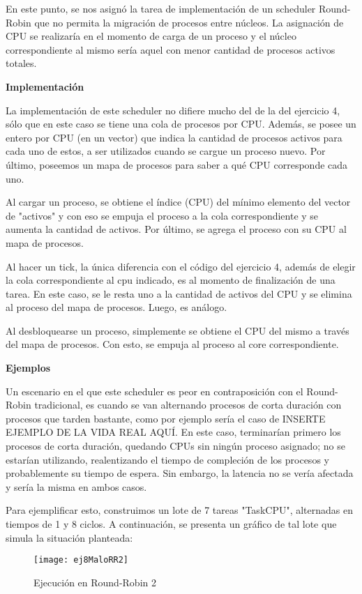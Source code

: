 En este punto, se nos asignó la tarea de implementación de un scheduler Round-Robin que no permita la migración de procesos
entre núcleos. La asignación de CPU se realizaría en el momento de carga de un proceso y el núcleo correspondiente al mismo sería aquel con menor cantidad de procesos activos totales.

\textbf{Implementación}

La implementación de este scheduler no difiere mucho del de la del ejercicio 4, sólo que en este caso se tiene una cola de procesos por CPU. Además, se posee un entero por CPU (en un vector) que indica la cantidad de procesos activos para cada uno de estos, a ser utilizados cuando se cargue un proceso nuevo. Por último, poseemos un mapa de procesos para saber a qué CPU corresponde cada uno.

Al cargar un proceso, se obtiene el índice (CPU) del mínimo elemento del vector de "activos" y con eso se empuja el proceso a la cola correspondiente y se aumenta la cantidad de activos. Por último, se agrega el proceso con su CPU al mapa de procesos.

Al hacer un tick, la única diferencia con el código del ejercicio 4, además de elegir la cola correspondiente al cpu indicado, es al momento de finalización de una tarea. En este caso, se le resta uno a la cantidad de activos del CPU y se elimina al proceso del mapa de procesos. Luego, es análogo.

Al desbloquearse un proceso, simplemente se obtiene el CPU del mismo a través del mapa de procesos. Con esto, se empuja al proceso al core correspondiente.

\textbf{Ejemplos}

Un escenario en el que este scheduler es peor en contraposición con el Round-Robin tradicional, es cuando se van alternando procesos de corta duración con procesos que tarden bastante, como por ejemplo sería el caso de INSERTE EJEMPLO DE LA VIDA REAL AQUÍ. En este caso, terminarían primero los procesos de corta duración, quedando CPUs sin ningún proceso asignado; no se estarían utilizando, realentizando el tiempo de compleción de los procesos y probablemente su tiempo de espera. Sin embargo, la latencia no se vería afectada y sería la misma en ambos casos.

Para ejemplificar esto, construimos un lote de 7 tareas "TaskCPU", alternadas en tiempos de 1 y 8 ciclos. A continuación, se presenta un gráfico de tal lote que simula la situación planteada:

\begin{figure}[h]
    \texttt{[image: ej8MaloRR2]}
    \caption{Ejecución en Round-Robin 2}
    \label{RR2Malo}
\end{figure}

